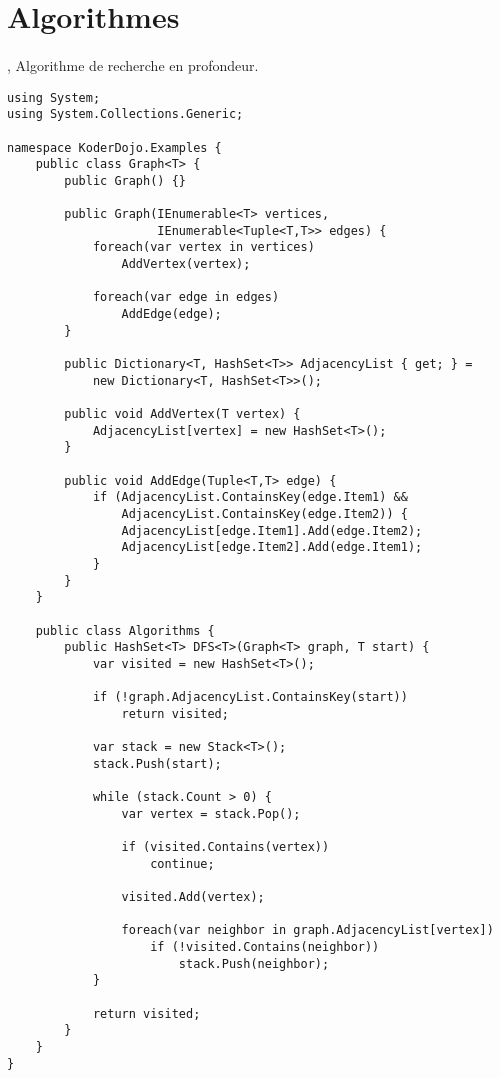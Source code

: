 \section{Algorithmes}
\label{algorithms}

\paragraph{} \cite{Algorithm2}, Algorithme de recherche en profondeur.

\begin{lstlisting}
using System;
using System.Collections.Generic;

namespace KoderDojo.Examples {
    public class Graph<T> {
        public Graph() {}

        public Graph(IEnumerable<T> vertices,
                     IEnumerable<Tuple<T,T>> edges) {
            foreach(var vertex in vertices)
                AddVertex(vertex);

            foreach(var edge in edges)
                AddEdge(edge);
        }

        public Dictionary<T, HashSet<T>> AdjacencyList { get; } =
            new Dictionary<T, HashSet<T>>();

        public void AddVertex(T vertex) {
            AdjacencyList[vertex] = new HashSet<T>();
        }

        public void AddEdge(Tuple<T,T> edge) {
            if (AdjacencyList.ContainsKey(edge.Item1) &&
                AdjacencyList.ContainsKey(edge.Item2)) {
                AdjacencyList[edge.Item1].Add(edge.Item2);
                AdjacencyList[edge.Item2].Add(edge.Item1);
            }
        }
    }

    public class Algorithms {
        public HashSet<T> DFS<T>(Graph<T> graph, T start) {
            var visited = new HashSet<T>();

            if (!graph.AdjacencyList.ContainsKey(start))
                return visited;
                
            var stack = new Stack<T>();
            stack.Push(start);

            while (stack.Count > 0) {
                var vertex = stack.Pop();

                if (visited.Contains(vertex))
                    continue;

                visited.Add(vertex);

                foreach(var neighbor in graph.AdjacencyList[vertex])
                    if (!visited.Contains(neighbor))
                        stack.Push(neighbor);
            }

            return visited;
        }
    }
}
\end{lstlisting}    

